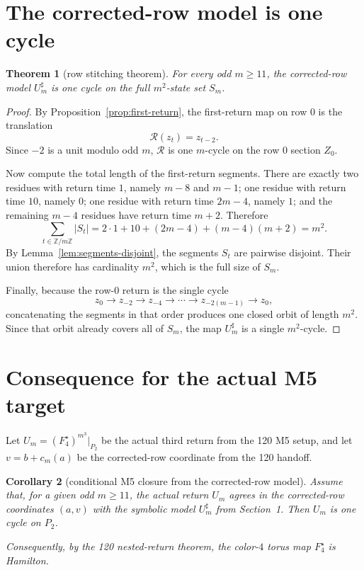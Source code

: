 \documentclass[11pt]{article}
\newtheorem{theorem}{Theorem}[section]
\newtheorem{corollary}[theorem]{Corollary}
\newcommand{\Z}{\mathbb Z}
\newcommand{\Sm}{S_m}
\newcommand{\Um}{U_m^{\sharp}}
\begin{document}
\section{The corrected-row model is one cycle}

\begin{theorem}[row stitching theorem]\label{thm:model-one-cycle}
For every odd $m\ge 11$, the corrected-row model $\Um$ is one cycle on the full
$m^2$-state set $\Sm$.
\end{theorem}

\begin{proof}
By Proposition~\ref{prop:first-return}, the first-return map on row $0$ is the
translation
\[
\mathcal R(z_t)=z_{t-2}.
\]
Since $-2$ is a unit modulo odd $m$, $\mathcal R$ is one $m$-cycle on the row
$0$ section $Z_0$.

Now compute the total length of the first-return segments. There are exactly two
residues with return time $1$, namely $m-8$ and $m-1$; one residue with return
time $10$, namely $0$; one residue with return time $2m-4$, namely $1$; and the
remaining $m-4$ residues have return time $m+2$. Therefore
\[
\sum_{t\in\Z/m\Z}\lvert S_t\rvert
=2\cdot 1 + 10 + (2m-4) + (m-4)(m+2) = m^2.
\]
By Lemma~\ref{lem:segments-disjoint}, the segments $S_t$ are pairwise disjoint.
Their union therefore has cardinality $m^2$, which is the full size of $\Sm$.

Finally, because the row-$0$ return is the single cycle
\[
z_0\to z_{-2}\to z_{-4}\to\cdots\to z_{-2(m-1)}\to z_0,
\]
concatenating the segments in that order produces one closed orbit of length
$m^2$. Since that orbit already covers all of $\Sm$, the map $\Um$ is a single
$m^2$-cycle.
\end{proof}

\section{Consequence for the actual M5 target}

Let $U_m=(F_4^{\star})^{m^3}|_{P_2}$ be the actual third return from the 120
M5 setup, and let $v=b+c_m(a)$ be the corrected-row coordinate from the 120
handoff.

\begin{corollary}[conditional M5 closure from the corrected-row model]
Assume that, for a given odd $m\ge 11$, the actual return $U_m$ agrees in the
corrected-row coordinates $(a,v)$ with the symbolic model $\Um$ from
Section~1. Then $U_m$ is one cycle on $P_2$.

Consequently, by the 120 nested-return theorem, the color-$4$ torus map
$F_4^{\star}$ is Hamilton.
\end{corollary}
\end{document}
